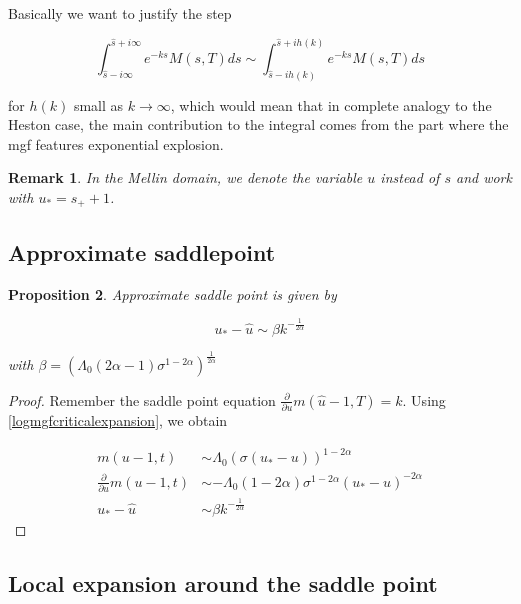 \documentclass[12pt]{article}
\theoremstyle{plain}
\newtheorem{proposition}{Proposition}[section]
\newtheorem{remark}[proposition]{Remark}
\begin{document}
Basically we want to justify the step

$$
\int_{\hat s-i\infty}^{\hat s + i\infty} e^{-ks} M(s,T)ds \sim \int_{\hat s -ih(k)}^{\hat s + ih(k)} e^{-ks} M(s,T)ds
$$

for $h(k)$ small as $k\rightarrow \infty$, which would mean that in complete analogy to the Heston case, the main contribution to the integral comes from the part where the mgf features exponential explosion.

\begin{remark}
In the Mellin domain, we denote the variable $u$ instead of $s$ and work with $u_* = s_+ +1$.
\end{remark}

\subsection{Approximate saddlepoint}

\begin{proposition}
Approximate saddle point is given by

\begin{equation} \label{approximatesaddlepoint}
u_* - \hat u \sim \beta k ^{-\frac{1}{2\alpha}}
\end{equation}

with $\beta = \left(\Lambda_0(2\alpha -1) \sigma ^ {1-2\alpha}\right)^{\frac{1}{2\alpha}}$

\end{proposition}

\begin{proof}

Remember the saddle point equation $\frac{\partial}{\partial u}m(\hat u - 1, T) = k$. Using \eqref{logmgfcriticalexpansion}, we obtain

$$
\begin{aligned}
m(u - 1,t)&\sim \Lambda_0 (\sigma(u_*-u))^{1-2\alpha}\\
\frac{\partial}{\partial u} m(u-1,t) &\sim - \Lambda_0 (1-2\alpha) \sigma^{1-2\alpha} (u_*-u)^{-2\alpha}\\
u_*-\hat u &\sim \beta k ^{-\frac{1}{2\alpha}}
\end{aligned}
$$

\end{proof}

\subsection{Local expansion around the saddle point}
\end{document}
